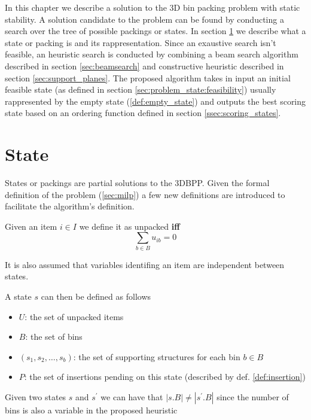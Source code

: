In this chapter we describe a solution to the 3D bin packing problem with static stability.
A solution candidate to the problem can be found by conducting a search over the tree of possible packings or states. In section \ref{sec:problem_state} we describe what a state or packing is and its rappresentation.
Since an exaustive search isn't feasible, an heuristic search is conducted by combining a beam search algorithm described in section \ref{sec:beamsearch} and constructive heuristic described in section \ref{sec:support_planes}.
The proposed algorithm takes in input an initial feasible state (as defined in section \ref{sec:problem_state:feasibility}) usually rappresented by the empty state (\ref{def:empty_state}) and outputs the best scoring state based on an ordering function defined in section \ref{ssec:scoring_states}.

\section{State}
\label{sec:problem_state}%
States or packings are partial solutions to the 3DBPP. Given the formal definition of the problem (\ref{sec:milp}) a few new definitions are introduced to facilitate the algorithm's definition.
\begin{definition}
    Given an item $i \in I$ we define it as unpacked \textbf{iff}
    \begin{equation*}
        \sum_{b \in B} u_{ib} = 0
    \end{equation*}
\end{definition}

It is also assumed that variables identifing an item are independent between states.

A state $s$ can then be defined as follows
\begin{itemize}
    \item $U$: the set of unpacked items
    \item $B$: the set of bins
    \item $(s_1, s_2,\dots, s_b)$: the set of supporting structures for each bin $b \in B$
    \item $P$: the set of insertions pending on this state (described by def. \ref{def:insertion})
\end{itemize}

\begin{observation}
    Given two states $s$ and $s^\prime$ we can have that $|s.B| \neq |s^\prime.B|$ since the number of bins is also a variable in the proposed heuristic
\end{observation}

